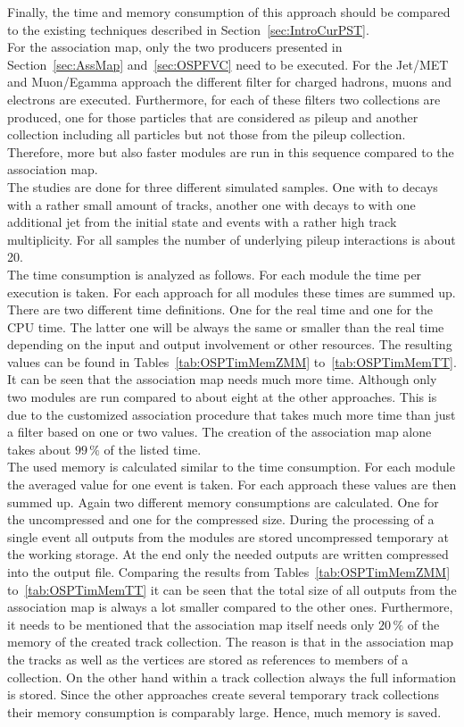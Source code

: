 Finally, the time and memory consumption of this approach should be compared to the existing techniques described in Section~\ref{sec:IntroCurPST}. \\
For the association map, only the two producers presented in Section~\ref{sec:AssMap} and~\ref{sec:OSPFVC} need to be executed. For the Jet/MET and Muon/Egamma approach the different filter for charged hadrons, muons and electrons are executed. Furthermore, for each of these filters two collections are produced, one for those particles that are considered as pileup and another collection including all particles but not those from the pileup collection. Therefore, more but also faster modules are run in this sequence compared to the association map. \\
The studies are done for three different simulated samples. One with \Zz to \EE decays with a rather small amount of tracks, another one with \Zz decays to \MM with one additional jet from the initial state and \ttbar events with a rather high track multiplicity. For all samples the number of underlying pileup interactions is about 20. \\
The time consumption is analyzed as follows. For each module the time per execution is taken. For each approach for all modules these times are summed up. There are two different time definitions. One for the real time and one for the CPU time. The latter one will be always the same or smaller than the real time depending on the input and output involvement or other resources. The resulting values can be found in Tables~\ref{tab:OSPTimMemZMM} to~\ref{tab:OSPTimMemTT}. It can be seen that the association map needs much more time. Although only two modules are run compared to about eight at the other approaches. This is due to the customized association procedure that takes much more time than just a filter based on one or two values. The creation of the association map alone takes about $99\,\%$ of the listed time. \\
The used memory is calculated similar to the time consumption. For each module the averaged value for one event is taken. For each approach these values are then summed up. Again two different memory consumptions are calculated. One for the uncompressed and one for the compressed size. During the processing of a single event all outputs from the modules are stored uncompressed temporary at the working storage. At the end only the needed outputs are written compressed into the output file. Comparing the results from Tables~\ref{tab:OSPTimMemZMM} to~\ref{tab:OSPTimMemTT} it can be seen that the total size of all outputs from the association map is always a lot smaller compared to the other ones. Furthermore, it needs to be mentioned that the association map itself needs only $20\,\%$ of the memory of the created track collection. The reason is that  in the association map the tracks as well as the vertices are stored as references to members of a collection. On the other hand within a track collection always the full information is stored. Since the other approaches create several temporary track collections their memory consumption is comparably large. Hence, much memory is saved.




